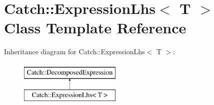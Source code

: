 \hypertarget{classCatch_1_1ExpressionLhs}{}\section{Catch\+:\+:Expression\+Lhs$<$ T $>$ Class Template Reference}
\label{classCatch_1_1ExpressionLhs}
Inheritance diagram for Catch\+:\+:Expression\+Lhs$<$ T $>$\+:\begin{figure}[H]
\begin{center}
\leavevmode
\includegraphics[height=2.000000cm]{classCatch_1_1ExpressionLhs}
\end{center}
\end{figure}

